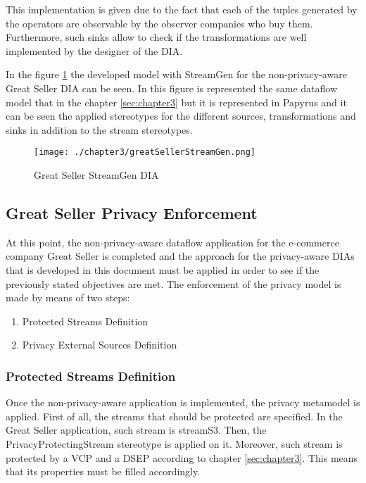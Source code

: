 This implementation is given due to the fact that each of the tuples generated by the operators are observable by the observer companies who buy them. Furthermore, such sinks allow to check if the transformations are well implemented by the designer of the DIA.

In the figure \ref{fig:Great Seller StreamGen DIA} the developed model with StreamGen for the non-privacy-aware Great Seller DIA can be seen. In this figure is represented the same dataflow model that in the chapter \ref{sec:chapter3} but it is represented in Papyrus and it can be seen the applied stereotypes for the different sources, transformations and sinks in addition to the stream stereotypes.

\begin{figure}
\centering
{\texttt{[image: ./chapter3/greatSellerStreamGen.png]}}
\caption{Great Seller StreamGen DIA}
\label{fig:Great Seller StreamGen DIA}
\end{figure}

\subsection{Great Seller Privacy Enforcement}

At this point, the non-privacy-aware dataflow application for the e-commerce company Great Seller is completed and the approach for the privacy-aware DIAs that is developed in this document must be applied in order to see if the previously stated objectives are met. The enforcement of the privacy model is made by means of two steps:

\begin{enumerate}
\item Protected Streams Definition
\item Privacy External Sources Definition
\end{enumerate}

\subsubsection{Protected Streams Definition}

Once the non-privacy-aware application is implemented, the privacy metamodel is applied. First of all, the streams that should be protected are specified. In the Great Seller application, such stream is streamS3. Then, the PrivacyProtectingStream stereotype is applied on it. Moreover, such stream is protected by a VCP and a DSEP according to chapter \ref{sec:chapter3}. This means that its properties must be filled accordingly.

